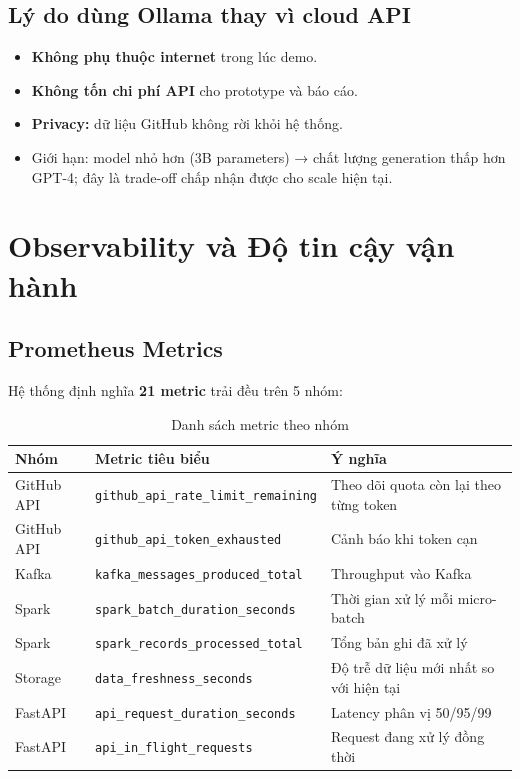 \documentclass[12pt,a4paper]{article}
\newcommand{\tech}[1]{\texttt{#1}}
\newcommand{\kw}[1]{\textbf{#1}}
\begin{document}
\subsection{Lý do dùng Ollama thay vì cloud API}

\begin{itemize}[leftmargin=1.5em]
  \item \kw{Không phụ thuộc internet} trong lúc demo.
  \item \kw{Không tốn chi phí API} cho prototype và báo cáo.
  \item \kw{Privacy:} dữ liệu GitHub không rời khỏi hệ thống.
  \item Giới hạn: model nhỏ hơn (3B parameters) → chất lượng generation
        thấp hơn GPT-4; đây là trade-off chấp nhận được cho scale hiện tại.
\end{itemize}

\section{Observability và Độ tin cậy vận hành}

\subsection{Prometheus Metrics}

Hệ thống định nghĩa \kw{21 metric} trải đều trên 5 nhóm:

\begin{table}[H]
  \centering
  \caption{Danh sách metric theo nhóm}
  \begin{tabularx}{\linewidth}{p{3cm}p{5cm}X}
    \toprule
    \textbf{Nhóm} & \textbf{Metric tiêu biểu} & \textbf{Ý nghĩa} \\
    \midrule
    GitHub API
      & \tech{github\_api\_rate\_limit\_remaining}
      & Theo dõi quota còn lại theo từng token \\
    GitHub API
      & \tech{github\_api\_token\_exhausted}
      & Cảnh báo khi token cạn \\
    Kafka
      & \tech{kafka\_messages\_produced\_total}
      & Throughput vào Kafka \\
    Spark
      & \tech{spark\_batch\_duration\_seconds}
      & Thời gian xử lý mỗi micro-batch \\
    Spark
      & \tech{spark\_records\_processed\_total}
      & Tổng bản ghi đã xử lý \\
    Storage
      & \tech{data\_freshness\_seconds}
      & Độ trễ dữ liệu mới nhất so với hiện tại \\
    FastAPI
      & \tech{api\_request\_duration\_seconds}
      & Latency phân vị 50/95/99 \\
    FastAPI
      & \tech{api\_in\_flight\_requests}
      & Request đang xử lý đồng thời \\
    \bottomrule
  \end{tabularx}
\end{table}
\end{document}
